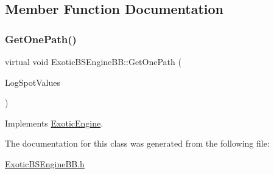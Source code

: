\subsection{Member Function Documentation}
\hypertarget{classExoticBSEngineBB_ad11cfbdc7c2096d8493e0de6eb1eec4b}{}\label{classExoticBSEngineBB_ad11cfbdc7c2096d8493e0de6eb1eec4b} 
\subsubsection{\texorpdfstring{Get\+One\+Path()}{GetOnePath()}}
{\footnotesize\ttfamily virtual void Exotic\+B\+S\+Engine\+B\+B\+::\+Get\+One\+Path (\begin{DoxyParamCaption}\item[{\hyperlink{classMJArray}{M\+J\+Array} \&}]{Log\+Spot\+Values }\end{DoxyParamCaption})\hspace{0.3cm}{\ttfamily [virtual]}}



Implements \hyperlink{classExoticEngine_a1be567d24e89abadb95bb2af7224b54e}{Exotic\+Engine}.



The documentation for this class was generated from the following file\+:\begin{DoxyCompactItemize}
\item 
\hyperlink{ExoticBSEngineBB_8h}{Exotic\+B\+S\+Engine\+B\+B.\+h}\end{DoxyCompactItemize}
